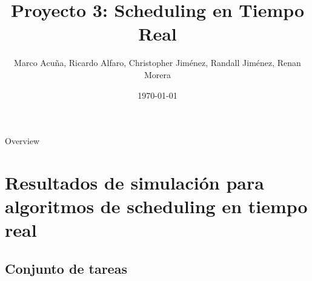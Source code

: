 \documentclass[xcolor=table]{beamer}
\title[Proyecto 3: Scheduling en Tiempo Real]{Proyecto 3: Scheduling en Tiempo Real} %
\author{Marco Acuña, Ricardo Alfaro, Christopher Jiménez, Randall Jiménez, Renan Morera} %
\institute[Maestria en Ciencias de la Computacion] %
{
Tecnologico de Costa Rica\\ %
\medskip
}
\date{\today} %
\begin{document}
\begin{frame}
\titlepage %
\end{frame}

\begin{frame}{Overview} %
\tableofcontents
\end{frame}



\section{Resultados de simulación para algoritmos de scheduling en tiempo real}

\subsection{Conjunto de tareas}
\begin{frame}


\end{frame}




%










\end{document}
